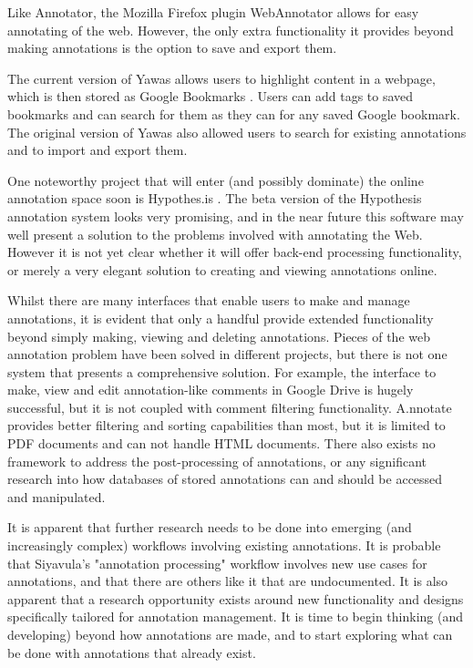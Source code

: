 Like Annotator, the Mozilla Firefox plugin WebAnnotator \citep{WebAnnotator1} \citep{WebAnnotator2} allows for easy annotating of the web. However, the only extra functionality it provides beyond making annotations is the option to save and export them. 

The current version of Yawas \citep{YawasLink} allows users to highlight content in a webpage, which is then stored as Google Bookmarks \citep{GBookmarks}. Users can add tags to saved bookmarks and can search for them as they can for any saved Google bookmark. The original version of Yawas \citep{Yawas} also allowed users to search for existing annotations and to import and export them. 

One noteworthy project that will enter (and possibly dominate) the online annotation space soon is Hypothes.is \citep{Hypothesis}. The beta version of the Hypothesis annotation system looks very promising, and in the near future this software may well present a solution to the problems involved with annotating the Web. However it is not yet clear whether it will offer back-end processing functionality, or merely a very elegant solution to creating and viewing annotations online.

Whilst there are many interfaces that enable users to make and manage annotations, it is evident that only a handful provide extended functionality beyond simply making, viewing and deleting annotations. Pieces of the web annotation problem have been solved in different projects, but there is not one system that presents a comprehensive solution. For example, the interface to make, view and edit annotation-like comments in Google Drive is hugely successful, but it is not coupled with comment filtering functionality. A.nnotate provides better filtering and sorting capabilities than most, but it is limited to PDF documents and can not handle HTML documents. There also exists no framework to address the post-processing of annotations, or any significant research into how databases of stored annotations can and should be accessed and manipulated. 

It is apparent that further research needs to be done into emerging (and increasingly complex) workflows involving existing annotations. It is probable that Siyavula's "annotation processing" workflow involves new use cases for annotations, and that there are others like it that are undocumented. It is also apparent that a research opportunity exists around new functionality and designs specifically tailored for annotation management. It is time to begin thinking (and developing) beyond how annotations are made, and to start exploring what can be done with annotations that already exist. 
